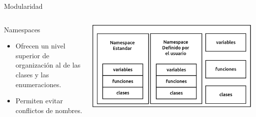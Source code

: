 \documentclass[aspectratio=169,presentation]{beamer}
\begin{document}
\begin{frame}[label={sec:orgd04131f}]{Modularidad}
\begin{columns}
\begin{column}{0.28\columnwidth}
\begin{block}{Namespaces}
\begin{itemize}
\item Ofrecen un nivel superior de organización al de las clases y las
enumeraciones.
\item Permiten evitar conflictos de nombres.
\end{itemize}
\end{block}
\end{column}
\begin{column}{0.48\columnwidth}
\begin{center}
\includegraphics[width=.9\linewidth]{./img/namespaces.png}
\end{center}
\end{column}
\end{columns}
\end{frame}
\end{document}
